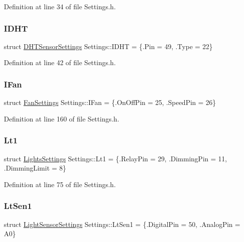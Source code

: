 Definition at line 34 of file Settings.\+h.

\mbox{\label{struct_settings_aa1cc318b5572edd7941321e8d941496c}} 
\subsubsection{\texorpdfstring{I\+D\+HT}{IDHT}}
{\footnotesize\ttfamily struct \hyperlink{struct_settings_1_1_d_h_t_sensor_settings}{D\+H\+T\+Sensor\+Settings} Settings\+::\+I\+D\+HT = \{.Pin = 49, .Type = 22\}}



Definition at line 42 of file Settings.\+h.

\mbox{\label{struct_settings_ab4e978c3bd46bc349e83231c51609ae3}} 
\subsubsection{\texorpdfstring{I\+Fan}{IFan}}
{\footnotesize\ttfamily struct \hyperlink{struct_settings_1_1_fan_settings}{Fan\+Settings} Settings\+::\+I\+Fan = \{.On\+Off\+Pin = 25, .Speed\+Pin = 26\}}



Definition at line 160 of file Settings.\+h.

\mbox{\label{struct_settings_a09771e5b5bdc58f62c2f38db6648b9ff}} 
\subsubsection{\texorpdfstring{Lt1}{Lt1}}
{\footnotesize\ttfamily struct \hyperlink{struct_settings_1_1_lights_settings}{Lights\+Settings} Settings\+::\+Lt1 = \{.Relay\+Pin = 29, .Dimming\+Pin = 11, .Dimming\+Limit = 8\}}



Definition at line 75 of file Settings.\+h.

\mbox{\label{struct_settings_a499fd8a31b36a6dc07df6719197b5d5e}} 
\subsubsection{\texorpdfstring{Lt\+Sen1}{LtSen1}}
{\footnotesize\ttfamily struct \hyperlink{struct_settings_1_1_light_sensor_settings}{Light\+Sensor\+Settings} Settings\+::\+Lt\+Sen1 = \{.Digital\+Pin = 50, .Analog\+Pin = A0\}}



